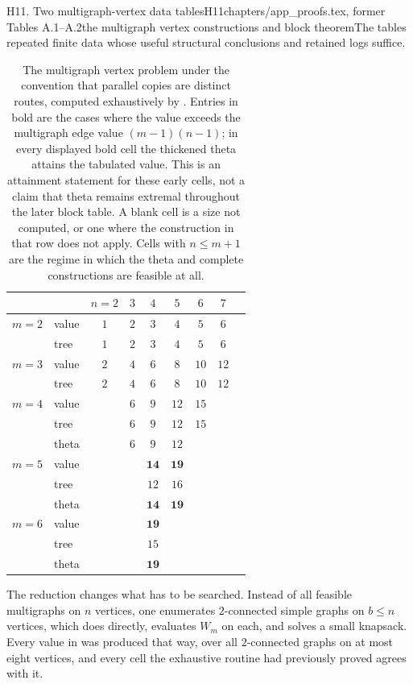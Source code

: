\begin{offcut}{H11. Two multigraph-vertex data tables}{H11}{chapters/app\_proofs.tex, former Tables A.1--A.2}{the multigraph vertex constructions and block theorem}{The tables repeated finite data whose useful structural conclusions and retained logs suffice.}
\begin{table}[ht]
\centering
\begin{tabular}{ll|ccccccc}
    & & $n=2$ & $3$ & $4$ & $5$ & $6$ & $7$ \\
    \midrule
    $m=2$ & value        & $1$ & $2$ & $3$ & $4$ & $5$ & $6$ \\
          & tree         & $1$ & $2$ & $3$ & $4$ & $5$ & $6$ \\
    \midrule
    $m=3$ & value        & $2$ & $4$ & $6$ & $8$ & $10$ & $12$ \\
          & tree         & $2$ & $4$ & $6$ & $8$ & $10$ & $12$ \\
    \midrule
    $m=4$ & value        &  & $6$ & $9$ & $12$ & $15$ &  \\
          & tree         &  & $6$ & $9$ & $12$ & $15$ &  \\
          & theta        &  & $6$ & $9$ & $12$ &  &  \\
    \midrule
    $m=5$ & value        &  &  & $\mathbf{14}$ & $\mathbf{19}$ &  &  \\
          & tree         &  &  & $12$ & $16$ &  &  \\
          & theta        &  &  & $\mathbf{14}$ & $\mathbf{19}$ &  &  \\
    \midrule
    $m=6$ & value        &  &  & $\mathbf{19}$ &  &  &  \\
          & tree         &  &  & $15$ &  &  &  \\
          & theta        &  &  & $\mathbf{19}$ &  &  &  \\
\end{tabular}
\caption{The multigraph vertex problem under the convention that parallel copies are distinct routes, computed exhaustively by . Entries in bold are the cases where the value exceeds the multigraph edge value $(m-1)(n-1)$; in every displayed bold cell the thickened theta attains the tabulated value. This is an attainment statement for these early cells, not a claim that theta remains extremal throughout the later block table. A blank cell is a size not computed, or one where the construction in that row does not apply. Cells with $n \le m+1$ are the regime in which the theta and complete constructions are feasible at all.}
\label{tab:multi-vertex}
\end{table}

\medskip
The reduction changes what has to be searched. Instead of all feasible multigraphs on $n$ vertices, one enumerates $2$-connected simple graphs on $b \le n$ vertices, which  does directly, evaluates $W_m$ on each, and solves a small knapsack. Every value in  was produced that way, over all $2$-connected graphs on at most eight vertices, and every cell the exhaustive routine had previously proved agrees with it.


\end{offcut}
